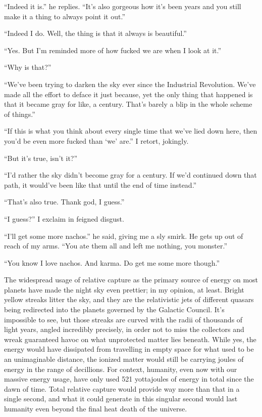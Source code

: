 \documentclass{book}
\begin{document}
			``Indeed it is.'' he replies. ``It's also gorgeous how it's been years and you still
			make it a thing to always point it out.''

			``Indeed I do. Well, the thing is that it always is beautiful.''

			``Yes. But I'm reminded more of how fucked we are when I look at it.''

			``Why is that?''

			``We've been trying to darken the sky ever since the Industrial Revolution. We've
			made all the effort to deface it just because, yet the only thing that happened is
			that it became gray for like, a century. That's barely a blip in the whole scheme of
			things.''

			``If this is what you think about every single time that we've lied down here, then
			you'd be even more fucked than `we' are.'' I retort, jokingly.

			``But it's true, isn't it?''

			``I'd rather the sky didn't become gray for a century. If we'd continued down that
			path, it would've been like that until the end of time instead.''

			``That's also true. Thank god, I guess.''

			``I guess?'' I exclaim in feigned disgust.

			``I'll get some more nachos.'' he said, giving me a sly smirk. He gets up out of reach
			of my arms. ``You ate them all and left me nothing, you monster.''

			``You know I love nachos. And karma. Do get me some more though.''

			The widespread usage of relative capture as the primary source of energy on most
			planets have made the night sky even prettier; in my opinion, at least. Bright yellow
			streaks litter the sky, and they are the relativistic jets of different quasars
			being redirected into the planets governed by the Galactic Council. It's impossible to
			see, but those streaks are curved with the radii of thousands of light years, angled incredibly
			precisely, in order not to miss the collectors and wreak guaranteed havoc on what
			unprotected matter lies beneath. While yes, the energy would have dissipated from
			travelling in empty space for what used to be an unimaginable distance, the ionized
			matter would still be carrying joules of energy in the range of decillions. For
			context, humanity, even now with our massive energy usage, have only used 521
			yottajoules of energy in total since the dawn of time. Total relative capture would
			provide way more than that in a single second, and what it could generate in this singular
			second would last humanity even beyond the final heat death of the universe.
\end{document}
